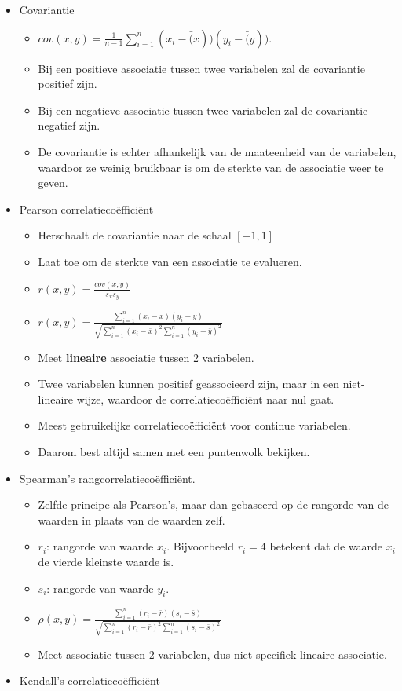 \documentclass[]{tufte-book}
\providecommand{\tightlist}{%
  \setlength{\itemsep}{0pt}\setlength{\parskip}{0pt}}
\begin{document}
\begin{itemize}
\tightlist
\item
  Covariantie

  \begin{itemize}
  \tightlist
  \item
    \(cov(x,y) = \frac{1}{n-1}\sum_{i=1}^{n}(x_i - \bar(x))(y_i-\bar(y))\).
  \item
    Bij een positieve associatie tussen twee variabelen zal de covariantie positief zijn.
  \item
    Bij een negatieve associatie tussen twee variabelen zal de covariantie negatief zijn.
  \item
    De covariantie is echter afhankelijk van de maateenheid van de variabelen, waardoor ze weinig bruikbaar is om de sterkte van de associatie weer te geven.
  \end{itemize}
\item
  Pearson correlatiecoëfficiënt

  \begin{itemize}
  \tightlist
  \item
    Herschaalt de covariantie naar de schaal \([-1,1]\)
  \item
    Laat toe om de sterkte van een associatie te evalueren.
  \item
    \(r(x,y) = \frac{cov(x,y)}{s_x s_y}\)
  \item
    \(r(x,y) = \frac{\sum_{i=1}^{n}(x_i-\bar{x})(y_i-\bar{y})}{\sqrt{\sum_{i=1}^{n}(x_i-\bar{x})^2 \sum_{i=1}^{n}(y_i-\bar{y})^2}}\)
  \item
    Meet \textbf{lineaire} associatie tussen 2 variabelen.
  \item
    Twee variabelen kunnen positief geassocieerd zijn, maar in een niet-lineaire wijze, waardoor de correlatiecoëfficiënt naar nul gaat.
  \item
    Meest gebruikelijke correlatiecoëfficiënt voor continue variabelen.
  \item
    Daarom best altijd samen met een puntenwolk bekijken.
  \end{itemize}
\item
  Spearman's rangcorrelatiecoëfficiënt.

  \begin{itemize}
  \tightlist
  \item
    Zelfde principe als Pearson's, maar dan gebaseerd op de rangorde van de waarden in plaats van de waarden zelf.
  \item
    \(r_i\): rangorde van waarde \(x_i\). Bijvoorbeeld \(r_i = 4\) betekent dat de waarde \(x_i\) de vierde kleinste waarde is.
  \item
    \(s_i\): rangorde van waarde \(y_i\).
  \item
    \(\rho(x,y) = \frac{\sum_{i=1}^{n}(r_i-\bar{r})(s_i-\bar{s})}{\sqrt{\sum_{i=1}^{n}(r_i-\bar{r})^2 \sum_{i=1}^{n}(s_i-\bar{s})^2}}\)
  \item
    Meet associatie tussen 2 variabelen, dus niet specifiek lineaire associatie.
  \end{itemize}
\item
  Kendall's correlatiecoëfficiënt


\end{itemize}
\end{document}

